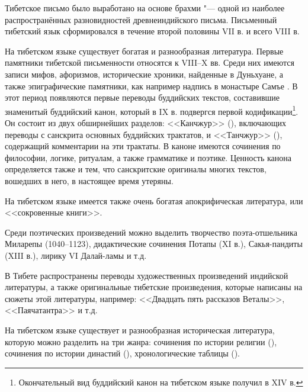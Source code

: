 Тибетское письмо было выработано на основе брахми "--- одной из наиболее распространённых разновидностей древнеиндийского письма. Письменный тибетский язык сформировался в течение второй половины VII в. и всего VIII в.

На тибетском языке существует богатая и разнообразная литература. Первые памятники тибетской письменности относятся к VIII--X вв. Среди них имеются записи мифов, афоризмов, исторические хроники, найденные в Дуньхуане, а также эпиграфические памятники, как например надпись в монастыре Самъе . В этот период появляются первые переводы буддийских текстов, составившие знаменитый буддийский канон, который в IX в. подвергся первой кодификации\footnote[2]{Окончательный вид буддийский канон на тибетском языке получил в XIV в.}. Он состоит из двух обширнейших разделов: <<Канчжур>> (), включающих переводы с санскрита основных буддийских трактатов, и <<Танчжур>> (), содержащий комментарии на эти трактаты. В каноне имеются сочинения по философии, логике, ритуалам, а также грамматике и поэтике. Ценность канона определяется также и тем, что санскритские оригиналы многих текстов, вошедших в него, в настоящее время утеряны.

На тибетском языке имеется также очень богатая апокрифическая литература, или <<сокровенные книги>>.

Среди поэтических произведений можно выделить творчество поэта-от\-шель\-ни\-ка Миларепы (1040--1123), дидактические сочинения Потапы (XI в.), Сакья-пандиты (XIII в.), лирику VI Далай-ламы и т.д.

В Тибете распространены переводы художественных произведений индийской литературы, а также оригинальные тибетские произведения, которые написаны на сюжеты этой литературы, например: <<Двадцать пять рассказов Веталы>>, <<Паячатантра>> и т.д.

На тибетском языке существует и разнообразная историческая литература, которую можно разделить на три жанра: сочинения по истории религии (), сочинения по истории династий (), хронологические таблицы ().


